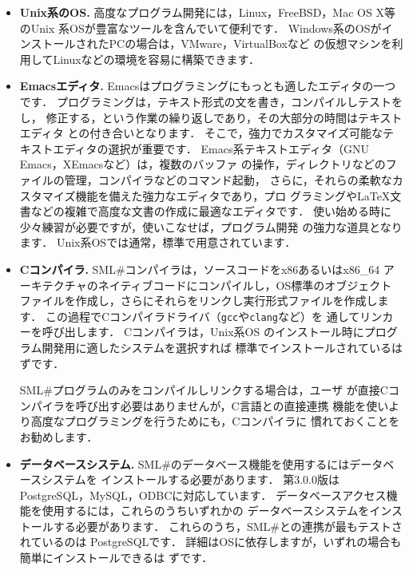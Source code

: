 \documentclass{jbook}
\newcommand{\smlsharp}{SML\#}
\newcommand{\version}{3.0.0}
\begin{document}
\begin{itemize}
\item {\bf Unix系のOS.}
	高度なプログラム開発には，Linux，FreeBSD，Mac OS X等のUnix
系OSが豊富なツールを含んでいて便利です．
	Windows系のOSがインストールされたPCの場合は，VMware，VirtualBoxなど
の仮想マシンを利用してLinuxなどの環境を容易に構築できます．

\item {\bf Emacsエディタ.}
	Emacsはプログラミングにもっとも適したエディタの一つです．
	プログラミングは，テキスト形式の文を書き，コンパイルしテストをし，
修正する，という作業の繰り返しであり，その大部分の時間はテキストエディタ
との付き合いとなります．
	そこで，強力でカスタマイズ可能なテキストエディタの選択が重要です．
	Emacs系テキストエディタ（GNU Emacs，XEmacsなど）は，複数のバッファ
の操作，ディレクトリなどのファイルの管理，コンパイラなどのコマンド起動，
さらに，それらの柔軟なカスタマイズ機能を備えた強力なエディタであり，プロ
グラミングやLaTeX文書などの複雑で高度な文書の作成に最適なエディタです．
	使い始める時に少々練習が必要ですが，使いこなせば，プログラム開発
の強力な道具となります．
	Unix系OSでは通常，標準で用意されています．

\item {\bf Cコンパイラ.}
	\smlsharp{}コンパイラは，ソースコードをx86あるいはx86\_64
アーキテクチャのネイティブコードにコンパイルし，OS標準のオブジェクト
ファイルを作成し，さらにそれらをリンクし実行形式ファイルを作成します．
	この過程でCコンパイラドライバ（{\tt gcc}や{\tt clang}など）を
通してリンカーを呼び出します．
	Cコンパイラは，Unix系OS%
のインストール時にプログラム開発用に適したシステムを選択すれば
標準でインストールされているはずです．

	\smlsharp{}プログラムのみをコンパイルしリンクする場合は，ユーザ
が直接Cコンパイラを呼び出す必要はありませんが，C言語との直接連携
機能を使いより高度なプログラミングを行うためにも，Cコンパイラに
慣れておくことをお勧めします．

\item {\bf データベースシステム.}
	\smlsharp{}のデータベース機能を使用するにはデータベースシステムを
インストールする必要があります．
	第\version{}版はPostgreSQL，MySQL，ODBCに対応しています．
	データベースアクセス機能を使用するには，これらのうちいずれかの
データベースシステムをインストールする必要があります．
	これらのうち，\smlsharp{}との連携が最もテストされているのは
PostgreSQLです．
	詳細はOSに依存しますが，いずれの場合も簡単にインストールできるは
ずです．
\end{itemize}
\end{document}
